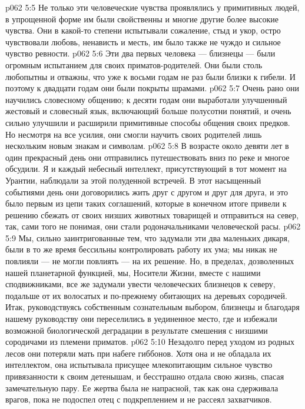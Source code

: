 \vs p062 5:5 Не только эти человеческие чувства проявлялись у примитивных людей, в упрощенной форме им были свойственны и многие другие более высокие чувства. Они в какой\hyp{}то степени испытывали сожаление, стыд и укор, остро чувствовали любовь, ненависть и месть, им было также не чуждо и сильное чувство ревности.
\vs p062 5:6 Эти два первых человека --- близнецы --- были огромным испытанием для своих приматов\hyp{}родителей. Они были столь любопытны и отважны, что уже к восьми годам не раз были близки к гибели. И поэтому к двадцати годам они были покрыты шрамами.
\vs p062 5:7 Очень рано они научились словесному общению; к десяти годам они выработали улучшенный жестовый и словесный язык, включающий больше полусотни понятий, и очень сильно улучшили и расширили примитивные способы общения своих предков. Но несмотря на все усилия, они смогли научить своих родителей лишь нескольким новым знакам и символам.
\vs p062 5:8 В возрасте около девяти лет в один прекрасный день они отправились путешествовать вниз по реке и многое обсудили. Я и каждый небесный интеллект, присутствующий в тот момент на Урантии, наблюдали за этой полуденной встречей. В этот насыщенный событиями день они договорились жить друг с другом и друг для друга, и это было первым из цепи таких соглашений, которые в конечном итоге привели к решению сбежать от своих низших животных товарищей и отправиться на север, так, сами того не понимая, они стали родоначальниками человеческой расы.
\vs p062 5:9 Мы, сильно заинтригованные тем, что задумали эти два маленьких дикаря, были в то же время бессильны контролировать работу их ума; мы никак не повлияли --- не могли повлиять --- на их решение. Но, в пределах, дозволенных нашей планетарной функцией, мы, Носители Жизни, вместе с нашими сподвижниками, все же задумали увести человеческих близнецов к северу, подальше от их волосатых и по\hyp{}прежнему обитающих на деревьях сородичей. Итак, руководствуясь собственным сознательным выбором, близнецы  и благодаря нашему руководству они переселились  в уединенное место, где и избежали возможной биологической деградации в результате смешения с низшими сородичами из племени приматов.
\vs p062 5:10 Незадолго перед уходом из родных лесов они потеряли мать при набеге гиббонов. Хотя она и не обладала их интеллектом, она испытывала присущее млекопитающим сильное чувство привязанности к своим детенышам, и бесстрашно отдала свою жизнь, спасая замечательную пару. Ее жертва была не напрасной, так как она сдерживала врагов, пока не подоспел отец с подкреплением и не рассеял захватчиков.
